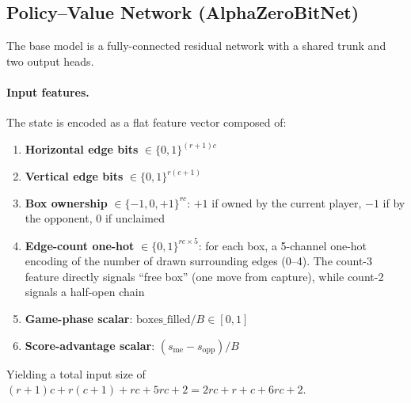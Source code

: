 \documentclass[11pt]{article}
\begin{document}
\subsection{Policy--Value Network (AlphaZeroBitNet)}
\label{sec:network}

The base model is a fully-connected residual network with a shared trunk
and two output heads.

\paragraph{Input features.}
The state is encoded as a flat feature vector composed of:
\begin{enumerate}
  \item \textbf{Horizontal edge bits} $\in \{0,1\}^{(r+1)c}$
  \item \textbf{Vertical edge bits} $\in \{0,1\}^{r(c+1)}$
  \item \textbf{Box ownership} $\in \{-1,0,+1\}^{rc}$: $+1$ if owned by
    the current player, $-1$ if by the opponent, $0$ if unclaimed
  \item \textbf{Edge-count one-hot} $\in \{0,1\}^{rc \times 5}$: for each
    box, a 5-channel one-hot encoding of the number of drawn surrounding
    edges (0--4). The count-3 feature directly signals ``free box'' (one
    move from capture), while count-2 signals a half-open chain
  \item \textbf{Game-phase scalar}: $\text{boxes\_filled} / B \in [0,1]$
  \item \textbf{Score-advantage scalar}: $(s_{\text{me}} - s_{\text{opp}}) / B$
\end{enumerate}
Yielding a total input size of
$(r{+}1)c + r(c{+}1) + rc + 5rc + 2 = 2rc + r + c + 6rc + 2$.
\end{document}
